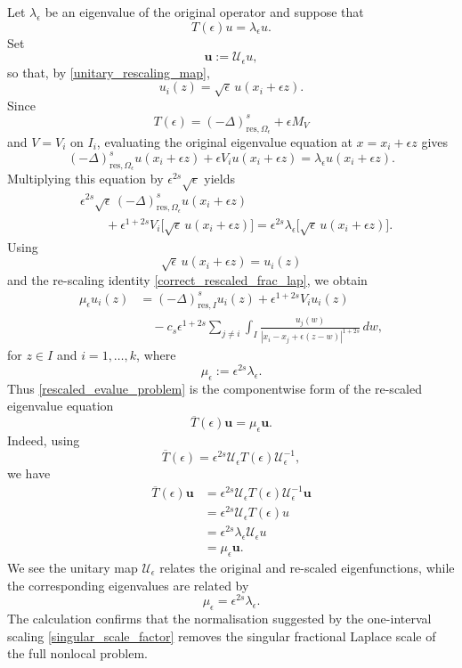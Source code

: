 \documentclass[preprint,12pt]{elsarticle}
\newcommand{\fvect}[1]{\mathbf{#1}}
\begin{document}
Let $\lambda_\epsilon$ be an eigenvalue of the original operator and
suppose that
\[
    T(\epsilon)u=\lambda_\epsilon u.
\]
Set
\[
    \fvect{u}:=\mathcal U_\epsilon u,
\]
so that, by \eqref{unitary_rescaling_map},
\[
    u_i(z)
    =
    \sqrt{\epsilon}\,u(x_i+\epsilon z).
\]
Since
\[
    T(\epsilon)
    =
    (-\Delta)^s_{\mathrm{res},\Omega_\epsilon}
    +
    \epsilon M_V
\]
and $V=V_i$ on $I_i$, evaluating the original eigenvalue equation at
$x=x_i+\epsilon z$ gives
\[
    (-\Delta)^s_{\mathrm{res},\Omega_\epsilon}
    u(x_i+\epsilon z)
    +
    \epsilon V_i u(x_i+\epsilon z)
    =
    \lambda_\epsilon u(x_i+\epsilon z).
\]
Multiplying this equation by $\epsilon^{2s}\sqrt{\epsilon}$ yields
\begin{align*}
&\epsilon^{2s}\sqrt{\epsilon}\,
(-\Delta)^s_{\mathrm{res},\Omega_\epsilon}
u(x_i+\epsilon z)\\
&\qquad
+
\epsilon^{1+2s}V_i
\bigl[\sqrt{\epsilon}\,u(x_i+\epsilon z)\bigr]
=
\epsilon^{2s}\lambda_\epsilon
\bigl[\sqrt{\epsilon}\,u(x_i+\epsilon z)\bigr].
\end{align*}
Using
\[
    \sqrt{\epsilon}\,u(x_i+\epsilon z)=u_i(z)
\]
and the re-scaling identity \eqref{correct_rescaled_frac_lap}, we
obtain
\begin{align}\label{rescaled_evalue_problem}
    \mu_\epsilon u_i(z)
    &=
    (-\Delta)^s_{\mathrm{res},I}u_i(z)
    +
    \epsilon^{1+2s}V_i u_i(z)\nonumber\\
    &\quad-
    c_s\epsilon^{1+2s}
    \sum_{j\neq i}
    \int_I
    \frac{u_j(w)}
    {|x_i-x_j+\epsilon(z-w)|^{1+2s}}\,dw,
\end{align}
for $z\in I$ and $i=1,\ldots,k$, where
\[
    \mu_\epsilon
    :=
    \epsilon^{2s}\lambda_\epsilon.
\]
Thus \eqref{rescaled_evalue_problem} is the componentwise form of the
re-scaled eigenvalue equation
\[
    \overline T(\epsilon)\fvect{u}
    =
    \mu_\epsilon\fvect{u}.
\]
Indeed, using
\[
    \overline T(\epsilon)
    =
    \epsilon^{2s}
    \mathcal U_\epsilon
    T(\epsilon)
    \mathcal U_\epsilon^{-1},
\]
we have
\begin{align*}
    \overline T(\epsilon)\fvect{u}
    &=
    \epsilon^{2s}
    \mathcal U_\epsilon
    T(\epsilon)
    \mathcal U_\epsilon^{-1}\fvect{u}\\
    &=
    \epsilon^{2s}
    \mathcal U_\epsilon
    T(\epsilon)u\\
    &=
    \epsilon^{2s}\lambda_\epsilon
    \mathcal U_\epsilon u\\
    &=
    \mu_\epsilon\fvect{u}.
\end{align*}
We see the unitary map $\mathcal U_\epsilon$ relates the original and
re-scaled eigenfunctions, while the corresponding eigenvalues are
related by
\[
    \mu_\epsilon=\epsilon^{2s}\lambda_\epsilon.
\]
The calculation confirms that
the normalisation suggested by the one-interval scaling
\eqref{singular_scale_factor} removes the singular fractional
Laplace scale of the full nonlocal problem.
\end{document}

